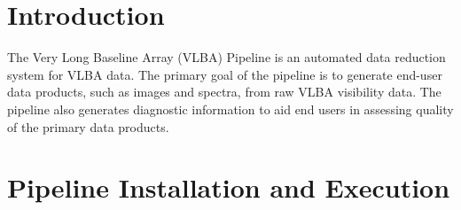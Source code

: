 \documentclass[10pt,onecolumn,final]{IEEEtran}
\begin{document}






%
\IEEEpeerreviewmaketitle



\section{Introduction}
% 
% 
% 
% 

The Very Long Baseline Array (VLBA) Pipeline is an automated data reduction system for VLBA data.  The primary goal of the pipeline is to generate end-user data products, such as images and spectra, from raw VLBA visibility data.  The pipeline also generates diagnostic information to aid end users in assessing quality of the primary data products.






\section{Pipeline Installation and Execution}
\end{document}
